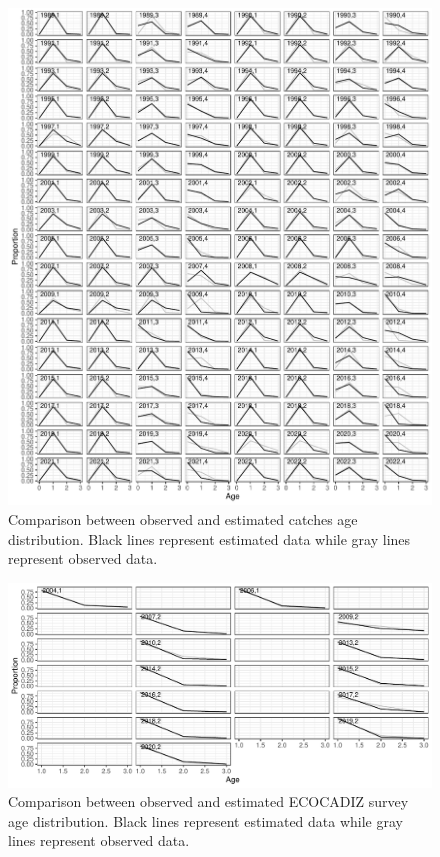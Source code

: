 \documentclass[review]{elsarticle}
\begin{document}
\begin{figure}
\centering
 \includegraphics[bb=0 0 595 697]{./agedist.pdf}
 \caption{ Comparison between observed and estimated catches age distribution. Black lines represent estimated data while gray lines represent observed data.}
 \label{agedist}
\end{figure}

\begin{figure}
\centering
 \includegraphics[bb=0 0 595 288]{./ecoagedist.pdf}
 \caption{ Comparison between observed and estimated ECOCADIZ survey age distribution. Black lines represent estimated data while gray lines represent observed data.}
 \label{ecoagedist}
\end{figure}
\end{document}
